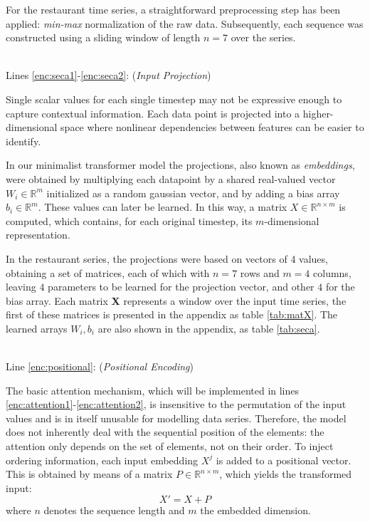 \documentclass[algorithms,article,submit,pdftex,moreauthors]{Definitions/mdpi}
\begin{document}
For the restaurant time series, a straightforward preprocessing step has been applied: \textit{min-max} normalization of the raw data. Subsequently, each sequence was constructed using a sliding window of length $n = 7$ over the series.

~\\Lines \ref{enc:seca1}-\ref{enc:seca2}: (\textit{Input Projection})

Single scalar values for each single timestep may not be expressive enough to capture contextual information. Each data point is projected into a higher-dimensional space where nonlinear dependencies between features can be easier to identify. 

In our minimalist transformer model the projections, also known as {\em embeddings}, were obtained by multiplying each datapoint by a shared real-valued vector $W_i \in \mathbb{R}^m$ initialized as a random gaussian vector, and by adding a bias array $b_i \in \mathbb{R}^m$. These values can later be learned. In this way, a matrix $X \in \mathbb{R}^{n\times m}$ is computed, which contains, for each original timestep, its $m$-dimensional representation.

In the restaurant series, the projections were based on vectors of 4 values, obtaining a set of matrices, each of which with $n=7$ rows and $m=4$ columns, leaving $4$ parameters to be learned for the projection vector, and other $4$ for the bias array. Each matrix {\bf X} represents a window over the input time series, the first of these matrices is presented in the appendix as table \ref{tab:matX}. The learned arrays $W_i, b_i$ are also shown in the appendix, as table \ref{tab:seca}.

~\\Line \ref{enc:positional}: (\textit{Positional Encoding})

The basic attention mechanism, which will be implemented in lines \ref{enc:attention1}-\ref{enc:attention2}, is insensitive to the permutation of the input values \cite{VSPU17} and is in itself unusable for modelling data series. Therefore, the model does not inherently deal with the sequential position of the elements: the attention only depends on the set of elements, not on their order. To inject ordering information, each input embedding $X^j$ is added to a positional vector. 
This is obtained by means of a matrix $P \in \mathbb{R}^{n \times m}$, which yields the transformed input: 
\begin{equation}
    X' = X + P
\end{equation}
where $n$ denotes the sequence length and $m$ the embedded dimension.
\end{document}

